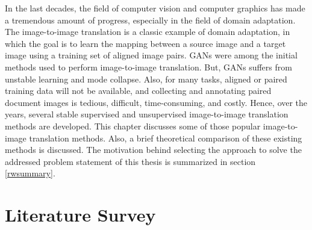 
\justifying
\setlength{\parskip}{1em}


In the last decades, the field of computer vision and computer graphics has made a tremendous amount of progress, especially in the field of domain adaptation. The image-to-image translation is a classic example of domain adaptation, in which the goal is to learn the mapping between a source image and a target image using a training set of aligned image pairs. \acp{GAN} were among the initial methods used to perform image-to-image translation\cite{pang2021imagetoimage}\cite{goodfellow2014generative}. But, \acp{GAN} suffers from unstable learning and mode collapse\cite{thanhtung2020catastrophic}. Also, for many tasks, aligned or paired training data will not be available, and collecting and annotating paired document images is tedious, difficult, time-consuming, and costly. Hence, over the years, several stable supervised and unsupervised image-to-image translation methods are developed. This chapter discusses some of those popular image-to-image translation methods. Also, a brief theoretical comparison of these existing methods is discussed. The motivation behind selecting the approach to solve the addressed problem statement of this thesis is summarized in section \ref{rwsummary}.



\section{Literature Survey}\label{LiteratureSurvey}


